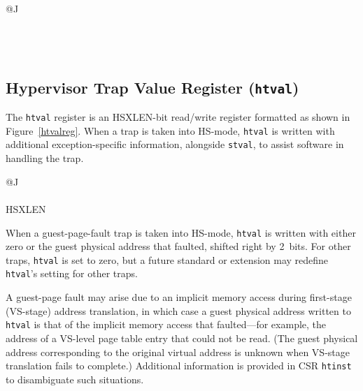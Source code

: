 \begin{figure*}[h!]
{\footnotesize
\begin{center}
\begin{tabular}{@{}J}
 \\
\hline
{} \\
\hline
{} \\
 \\
\end{tabular}
\end{center}
}
\vspace{-0.1in}
\caption{Hypervisor time delta registers, HSXLEN=32.}
\label{hdeltahreg}
\end{figure*}

\subsection{Hypervisor Trap Value Register ({\tt htval})}

The {\tt htval} register is an HSXLEN-bit read/write register formatted
as shown in Figure~\ref{htvalreg}.
When a trap is taken into HS-mode, {\tt htval} is written with additional
exception-specific information, alongside {\tt stval}, to assist software
in handling the trap.

\begin{figure*}[h!]
{\footnotesize
\begin{center}
\begin{tabular}{@{}J}
 \\
\hline
{} \\
\hline
HSXLEN \\
\end{tabular}
\end{center}
}
\vspace{-0.1in}
\caption{Hypervisor trap value register ({\tt htval}).}
\label{htvalreg}
\end{figure*}

When a guest-page-fault trap is taken into HS-mode, {\tt htval} is
written with either zero or the guest physical address that faulted,
shifted right by 2~bits.
For other traps, {\tt htval} is set to zero, but a future standard or
extension may redefine {\tt htval}'s setting for other traps.

A guest-page fault may arise due to an implicit memory access during
first-stage (VS-stage) address translation, in which case a guest
physical address written to {\tt htval} is that of the implicit memory
access that faulted---for example, the address of a VS-level page table
entry that could not be read.
(The guest physical address corresponding to the original virtual address
is unknown when VS-stage translation fails to complete.)
Additional information is provided in CSR {\tt htinst} to disambiguate
such situations.

